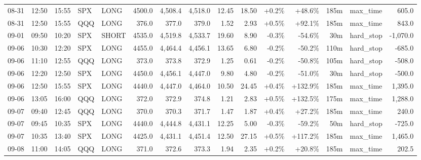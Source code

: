 \documentclass[11pt,a4paper,twoside]{article}
\begin{document}
\begin{landscape}
\begin{center}
\begin{longtable}{>{\color{txtmain}}l l l l l r r r r r r r r >{\color{txtmain}}l r}
08-31 & 12:50 & 15:55 & SPX & LONG & 4500.0 & 4,508.4 & 4,518.0 & 12.45 & 18.50 & \textcolor{wingreen}{+0.2\%} & \textcolor{wingreen}{+48.6\%} & 185m & max\_time & \textcolor{wingreen}{605.0} \\
08-31 & 12:50 & 15:55 & QQQ & LONG & 376.0 & 377.0 & 379.0 & 1.52 & 2.93 & \textcolor{wingreen}{+0.5\%} & \textcolor{wingreen}{+92.1\%} & 185m & max\_time & \textcolor{wingreen}{843.0} \\
09-01 & 09:50 & 10:20 & SPX & SHORT & 4535.0 & 4,519.8 & 4,533.7 & 19.60 & 8.90 & \textcolor{lossred}{-0.3\%} & \textcolor{lossred}{-54.6\%} & 30m & hard\_stop & \textcolor{lossred}{-1,070.0} \\
09-06 & 10:30 & 12:20 & SPX & LONG & 4455.0 & 4,464.4 & 4,456.1 & 13.65 & 6.80 & \textcolor{lossred}{-0.2\%} & \textcolor{lossred}{-50.2\%} & 110m & hard\_stop & \textcolor{lossred}{-685.0} \\
09-06 & 11:10 & 12:55 & QQQ & LONG & 373.0 & 373.8 & 372.9 & 1.25 & 0.61 & \textcolor{lossred}{-0.2\%} & \textcolor{lossred}{-50.8\%} & 105m & hard\_stop & \textcolor{lossred}{-508.0} \\
09-06 & 12:20 & 12:50 & SPX & LONG & 4450.0 & 4,456.1 & 4,447.0 & 9.80 & 4.80 & \textcolor{lossred}{-0.2\%} & \textcolor{lossred}{-51.0\%} & 30m & hard\_stop & \textcolor{lossred}{-500.0} \\
09-06 & 12:50 & 15:55 & SPX & LONG & 4440.0 & 4,447.0 & 4,464.0 & 10.50 & 24.45 & \textcolor{wingreen}{+0.4\%} & \textcolor{wingreen}{+132.9\%} & 185m & max\_time & \textcolor{wingreen}{1,395.0} \\
09-06 & 13:05 & 16:00 & QQQ & LONG & 372.0 & 372.9 & 374.8 & 1.21 & 2.83 & \textcolor{wingreen}{+0.5\%} & \textcolor{wingreen}{+132.5\%} & 175m & max\_time & \textcolor{wingreen}{1,288.0} \\
09-07 & 09:40 & 12:45 & QQQ & LONG & 370.0 & 370.3 & 371.7 & 1.47 & 1.87 & \textcolor{wingreen}{+0.4\%} & \textcolor{wingreen}{+27.2\%} & 185m & max\_time & \textcolor{wingreen}{240.0} \\
09-07 & 09:45 & 10:35 & SPX & LONG & 4440.0 & 4,444.8 & 4,431.1 & 12.25 & 5.00 & \textcolor{lossred}{-0.3\%} & \textcolor{lossred}{-59.2\%} & 50m & hard\_stop & \textcolor{lossred}{-725.0} \\
09-07 & 10:35 & 13:40 & SPX & LONG & 4425.0 & 4,431.1 & 4,451.4 & 12.50 & 27.15 & \textcolor{wingreen}{+0.5\%} & \textcolor{wingreen}{+117.2\%} & 185m & max\_time & \textcolor{wingreen}{1,465.0} \\
09-08 & 11:00 & 14:05 & QQQ & LONG & 371.0 & 372.6 & 373.3 & 1.94 & 2.35 & \textcolor{wingreen}{+0.2\%} & \textcolor{wingreen}{+20.8\%} & 185m & max\_time & \textcolor{wingreen}{202.5} \\

\end{longtable}
\end{center}
\end{landscape}
\end{document}
